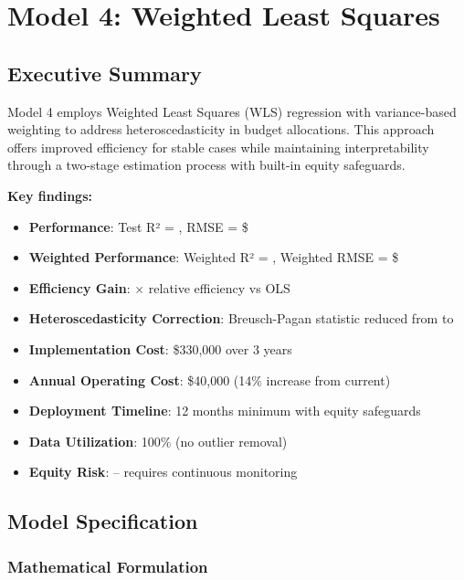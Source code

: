 \chapter{Model 4: Weighted Least Squares}\label{ch:model4}



\section{Executive Summary}

Model 4 employs Weighted Least Squares (WLS) regression with variance-based weighting to address heteroscedasticity in budget allocations. This approach offers improved efficiency for stable cases while maintaining interpretability through a two-stage estimation process with built-in equity safeguards.

\textbf{Key findings:}
\begin{itemize}
    \item \textbf{Performance}: Test R² = \ModelFourRSquaredTest{}, RMSE = \$\ModelFourRMSETest{}
    \item \textbf{Weighted Performance}: Weighted R² = \ModelFourWeightedRSquared{}, Weighted RMSE = \$\ModelFourWeightedRMSE{}
    \item \textbf{Efficiency Gain}: \ModelFourEfficiencyRatio{}$\times$ relative efficiency vs OLS
    \item \textbf{Heteroscedasticity Correction}: Breusch-Pagan statistic reduced from \ModelFourBreuschPagan{} to \ModelFourBreuschPaganAfter{}
    \item \textbf{Implementation Cost}: \$330,000 over 3 years
    \item \textbf{Annual Operating Cost}: \$40,000 (14\% increase from current)
    \item \textbf{Deployment Timeline}: 12 months minimum with equity safeguards
    \item \textbf{Data Utilization}: 100\% (no outlier removal)
    \item \textbf{Equity Risk}: \ModelFourEquityRisk{} -- requires continuous monitoring
\end{itemize}

\section{Model Specification}

\subsection{Mathematical Formulation}

